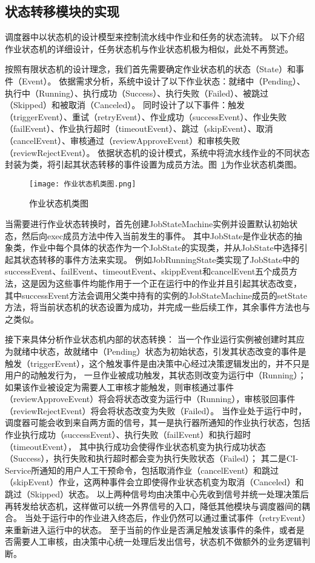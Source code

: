 \subsection{状态转移模块的实现}

调度器中以状态机的设计模型来控制流水线中作业和任务的状态流转。
以下介绍作业状态机的详细设计，任务状态机与作业状态机极为相似，此处不再赘述。

按照有限状态机的设计理念，我们首先需要确定作业状态机的状态（State）和事件（Event）。
依据需求分析，系统中设计了以下作业状态：就绪中（Pending）、执行中（Running）、执行成功（Success）、执行失败（Failed）、被跳过（Skipped）和被取消（Canceled）。
同时设计了以下事件：触发（triggerEvent）、重试（retryEvent）、作业成功（successEvent）、作业失败（failEvent）、作业执行超时（timeoutEvent）、跳过（skipEvent）、取消（cancelEvent）、审核通过（reviewApproveEvent）和审核失败（reviewRejectEvent）。
依据状态机的设计模式，系统中将流水线作业的不同状态封装为类，将引起其状态转移的事件设置为成员方法。图~\ref{fig:作业状态机类图}为作业状态机类图。

\begin{figure}[h]
  \centering
  \texttt{[image: 作业状态机类图.png]}
  \caption{作业状态机类图}
  \label{fig:作业状态机类图}
\end{figure}

当需要进行作业状态转换时，首先创建JobStateMachine实例并设置默认初始状态，然后向exec成员方法中传入当前发生的事件。
其中JobState是作业状态的抽象类，作业中每个具体的状态作为一个JobState的实现类，并从JobState中选择引起其状态转移的事件方法来实现。
例如JobRunningState类实现了JobState中的successEvent、failEvent、timeoutEvent、skippEvent和cancelEvent五个成员方法，这是因为这些事件均能作用于一个正在运行中的作业并且引起其状态改变，
其中successEvent方法会调用父类中持有的实例的JobStateMachine成员的setState方法，将当前状态机的状态设置为成功，并完成一些后续工作，其余事件方法也与之类似。

接下来具体分析作业状态机内部的状态转换：
当一个作业运行实例被创建时其应为就绪中状态，故就绪中（Pending）状态为初始状态，引发其状态改变的事件是触发（triggerEvent），这个触发事件是由决策中心经过决策逻辑发出的，并不只是用户的动触发行为，
一旦作业被成功触发，其状态则改变为运行中（Running）；如果该作业被设定为需要人工审核才能触发，则审核通过事件（reviewApproveEvent）将会将状态改变为运行中（Running），审核驳回事件（reviewRejectEvent）将会将状态改变为失败（Failed）。
当作业处于运行中时，调度器可能会收到来自两方面的信号，其一是执行器所通知的作业执行状态，包括作业执行成功（successEvent）、执行失败（failEvent）和执行超时（timeoutEvent），
其中执行成功会使得作业状态机变为执行成功状态（Success），执行失败和执行超时都会变为执行失败状态（Failed）；
其二是CI-Service所通知的用户人工干预命令，包括取消作业（cancelEvent）和跳过（skipEvent）作业，这两种事件会立即使得作业状态机变为取消（Canceled）和跳过（Skipped）状态。
以上两种信号均由决策中心先收到信号并统一处理决策后再转发给状态机，这样做可以统一外界信号的入口，降低其他模块与调度器间的耦合。
当处于运行中的作业进入终态后，作业仍然可以通过重试事件（retryEvent）来重新进入运行中的状态。
至于当前的作业是否满足触发该事件的条件，或者是否需要人工审核，由决策中心统一处理后发出信号，状态机不做额外的业务逻辑判断。

